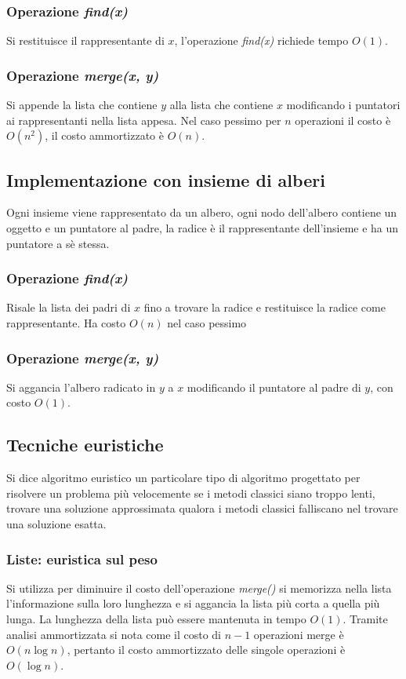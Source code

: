 \subsubsection{Operazione \emph{find(x)}}
Si restituisce il rappresentante di $x$, l'operazione \emph{find(x)} richiede tempo $O(1)$.
\subsubsection{Operazione \emph{merge(x, y)}}
Si appende la lista che contiene $y$ alla lista che contiene $x$ modificando i puntatori ai rappresentanti nella lista appesa. Nel caso pessimo per $n$ operazioni il costo \`e $O(n^2)$, il costo ammortizzato \`e
$O(n)$.
\subsection{Implementazione con insieme di alberi}
Ogni insieme viene rappresentato da un albero, ogni nodo dell'albero contiene un oggetto e un puntatore al padre, la radice \`e il rappresentante dell'insieme e ha un puntatore a s\`e stessa.
\subsubsection{Operazione \emph{find(x)}}
Risale la lista dei padri di $x$ fino a trovare la radice e restituisce la radice come rappresentante. Ha costo $O(n)$ nel caso pessimo
\subsubsection{Operazione \emph{merge(x, y)}}
Si aggancia l'albero radicato in $y$ a $x$ modificando il puntatore al padre di $y$, con costo $O(1)$.
\subsection{Tecniche euristiche}
Si dice algoritmo euristico un particolare tipo di algoritmo progettato per risolvere un problema pi\`u velocemente se i metodi classici siano troppo lenti, trovare una soluzione approssimata qualora i metodi 
classici falliscano nel trovare una soluzione esatta. 
\subsubsection{Liste: euristica sul peso}
Si utilizza per diminuire il costo dell'operazione \emph{merge()} si memorizza nella lista l'informazione sulla loro lunghezza e si aggancia la lista pi\`u corta a quella pi\`u lunga. La lunghezza della lista pu\`o 
essere mantenuta in tempo $O(1)$. Tramite analisi ammortizzata si nota come il costo di $n-1$ operazioni merge \`e $O(n\log n)$, pertanto il costo ammortizzato delle singole operazioni \`e $O(\log n)$.
